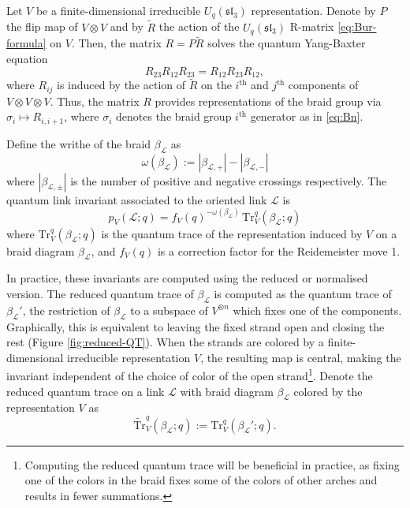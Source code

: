 \documentclass[12pt,oneside,reqno]{amsart}
\numberwithin{teorema}{section}
\numberwithin{definicion}{section}
\numberwithin{lema}{section}
\numberwithin{conjetura}{section}
\numberwithin{proposicion}{section}
\def\sl{\mathfrak{sl}}
\def\Uq{U_q}
\newcommand{\cL}{\mathcal{L}}
\begin{document}
Let $V$ be a finite-dimensional irreducible $\Uq(\sl_3)$ representation. Denote by $P$ the flip map of $V\otimes V$ and by $\widetilde{R}$ the action of the $\Uq(\sl_3)$ R-matrix \eqref{eq:Bur-formula} on $V$. Then, the matrix $R = P\widetilde{R}$ solves the quantum Yang-Baxter equation
\begin{equation}\label{eq:QYB}
    R_{23}R_{12}R_{23}=R_{12}R_{23}R_{12},
\end{equation}
where $R_{ij}$ is induced by the action of $\widetilde{R}$ on the $i^{\text{th}}$ and $j^\text{th}$ components of $V\otimes V\otimes V$.
Thus, the matrix $R$ provides representations of the braid group via $\sigma_i\mapsto R_{i,i+1}$, where $\sigma_i$ denotes the braid group $i^\text{th}$ generator as in \eqref{eq:Bn}.

Define the writhe of the braid $\beta_\cL$ as
\begin{equation*}
    \omega(\beta_\cL):=|\beta_{\cL,+}|-|\beta_{\cL,-}|
\end{equation*}
where $|\beta_{\cL,\pm}|$ is the number of positive and negative crossings respectively. The quantum link invariant associated to the oriented link $\cL$ is
\begin{equation*}
    p_V(\cL;q)=f_V(q)^{-\omega(\beta_\cL)} \, \text{Tr}^q_V(\beta_\cL;q)
\end{equation*}
where $\text{Tr}^q_V(\beta_\cL;q)$ is the quantum trace of the representation induced by $V$ on a braid diagram $\beta_\cL$, and $f_V(q)$ is a correction factor for the Reidemeister move 1.

In practice, these invariants are computed using the reduced or normalised version. The reduced quantum trace of $\beta_\cL$ is computed as the quantum trace of $\beta_\cL'$, the restriction of $\beta_\cL$ to a subspace of $V^{\otimes n}$ which fixes one of the components. Graphically, this is equivalent to leaving the fixed strand open and closing the rest (Figure \ref{fig:reduced-QT}). When the strands are colored by a finite-dimensional irreducible representation $V$, the resulting map is central, making the invariant independent of the choice of color of the open strand\footnote{Computing the reduced quantum trace will be beneficial in practice, as fixing one of the colors in the braid fixes some of the colors of other arches and results in fewer summations.}. Denote the reduced quantum trace on a link $\mathcal{L}$ with braid diagram $\beta_\cL$ colored by the representation $V$ as
\begin{equation*}
	\widetilde{\text{Tr}}^q_V (\beta_\cL;q):=\text{Tr}^q_V(\beta_\cL';q).
\end{equation*} 
\end{document}
